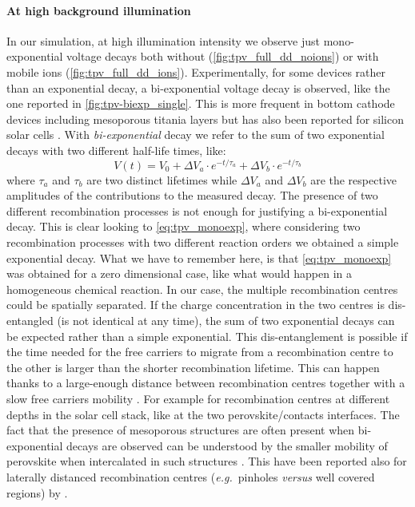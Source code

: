 		\paragraph{At high background illumination}
		In our simulation, at high illumination intensity we observe just mono\hyp{}exponential voltage decays both without (\cref{fig:tpv_full_dd_noions}) or with mobile ions (\cref{fig:tpv_full_dd_ions}).
		Experimentally, for some devices rather than an exponential decay, a bi\hyp{}exponential voltage decay is observed, like the one reported in \cref{fig:tpv-biexp_single}.
		This is more frequent in bottom cathode devices including mesoporous titania layers \cite{Carnie2015,ORegan2015b,Bertoluzzi2015} but has also been reported for silicon solar cells \cite{Kiermasch2018}.
		With \emph{bi\hyp{}exponential} decay we refer to the sum of two exponential decays with two different half\hyp{}life times, like:
		\begin{equation}\label{eq:tpv_biexp}
			V (t) = V_0 + \Delta V_a \cdot e^{-t/\tau_a} + \Delta V_b \cdot e^{-t/\tau_b}
		\end{equation}
		where $\tau_a$ and $\tau_b$ are two distinct lifetimes while $\Delta V_a$ and $\Delta V_b$ are the respective amplitudes of the contributions to the measured decay.
		The presence of two different recombination processes is not enough for justifying a bi\hyp{}exponential decay.
		This is clear looking to \cref{eq:tpv_monoexp}, where considering two recombination processes with two different reaction orders we obtained a simple exponential decay.
		What we have to remember here, is that \cref{eq:tpv_monoexp} was obtained for a zero dimensional case, like what would happen in a homogeneous chemical reaction.
		In our case, the multiple recombination centres could be spatially separated.
		If the charge concentration in the two centres is dis\hyp{}entangled (is not identical at any time), the sum of two exponential decays can be expected rather than a simple exponential.
		This dis\hyp{}entanglement is possible if the time needed for the free carriers to migrate from a recombination centre to the other is larger than the shorter recombination lifetime.
		This can happen thanks to a large\hyp{}enough distance between recombination centres together with a slow free carriers mobility \cite{Calado2018}.
		For example for recombination centres at different depths in the solar cell stack, like at the two perovskite/contacts interfaces.
		The fact that the presence of mesoporous structures are often present when bi\hyp{}exponential decays are observed can be understood by the smaller mobility of perovskite when intercalated in such structures \cite{Leijtens2014}.
		This have been reported also for laterally distanced recombination centres (\textsl{e.g.}\ pinholes \textsl{versus} well covered regions) by .


